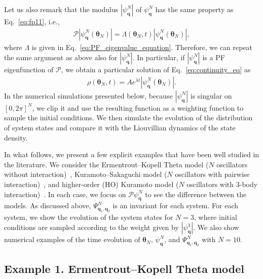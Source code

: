 \documentclass[
amsmath,amssymb,
]{revtex4-2}
\begin{document}
Let us also remark that the modulus $\left|\psi_{\bm{q}}^N\right|$ of $\psi^N_{\bm{q}}$ has the same property as Eq.~\eqref{eq:fp11}, i.e.,
%
\begin{align}
	\label{eq:fp_mod} 
    \mathcal{P} \left|\psi_{\bm{q}}^N (\bm{\theta}_N) \right| = \Lambda(\bm{\theta}_N, t) \left|\psi_{\bm{q}}^N (\bm{\theta}_N) \right|,
\end{align}
%
where $\Lambda$ is given in Eq.~\eqref{eq:PF_eigenvalue_equation}. 
%
Therefore, we can repeat the same argument as above also for $\left|\psi_{\bm{q}}^N\right|$. 
%
In particular, if $\left|\psi_{\bm{q}}^N\right|$ is a PF eigenfunction of $\mathcal{P}$,
we obtain a particular solution of Eq.~\eqref{eq:continuity_eq} as
%
\begin{align}
        \rho(\bm{\theta}_N, t) = A e^{\lambda t} \left|\psi^N_{\bm{q}} (\bm{\theta}_N) \right|.
\end{align}
%
In the numerical simulations presented below, because $\left|\psi^N_{\bm{q}}\right|$ is singular on $[0,2\pi]^N$, we clip it and use the resulting function as a weighting function to sample the initial conditions. We then simulate the evolution of the distribution of system states and compare it with the Liouvillian dynamics of the state density.

In what follows, we present a few explicit examples that have been well studied in the literature. 
%
We consider the Ermentrout--Kopell Theta model ($N$ oscillators without interaction)~\cite{ermentrout1986parabolic,ermentrout2008ekmodel}, Kuramoto--Sakaguchi model ($N$ oscillators with pairwise interaction)~\cite{Kuramoto1984chemical,sakaguchi1986soluble}, and higher-order (HO) Kuramoto model ($N$ oscillators with 3-body interaction)~\cite{tanaka2011multistable,skardal2020higher,leon2024anomalous,leon2025theory,fujii2025emergence}. In each case, we focus on $\mathcal{P}\psi^N_{\bm{q}}$ to see the difference between the models.
%
As discussed above, $\Psi^N_{\bm{q}_1, \bm{q}_2}$ is an invariant for each system. 
%
For each system, we show the evolution of the system states for $N=3$, where initial conditions are sampled according to the weight given by $\left|\psi^3_{\bm{q}}\right|$.
We also show numerical examples of the time evolution of $\bm{\theta}_N$, $\psi^N_{\bm{q}}$, and $\Psi^N_{\bm{q}_1, \bm{q}_2}$ with $N=10$.

\subsection{Example 1. Ermentrout--Kopell Theta model}
\end{document}
